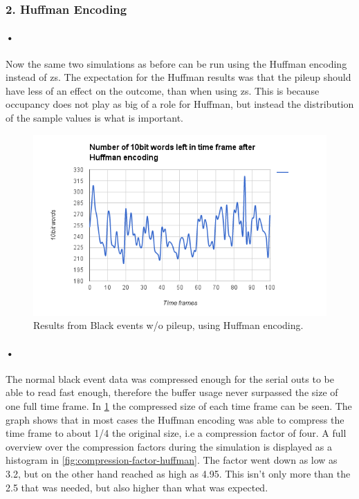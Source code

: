 \documentclass[a4paper, 12pt]{report}
\begin{document}
\subsubsection{2. Huffman Encoding}

\paragraph{•}
Now the same two simulations as before can be run using the Huffman encoding instead of \gls{zs}.
The expectation for the Huffman results was that the pileup should have less of an effect on the outcome, than when using \gls{zs}.
This is because occupancy does not play as big of a role for Huffman, but instead the distribution of the sample values is what is important.

\begin{figure}[h!]
	\centering
		\includegraphics[width=1.0\textwidth]{images/blackevents-huffman.png}
		\caption{Results from Black events w/o pileup, using Huffman encoding.}
		\label{fig:blackevents-huffman}
\end{figure}

\paragraph{•}
The normal black event data was compressed enough for the serial outs to be able to read fast enough, therefore the buffer usage never surpassed the size of one full time frame.
In \ref{fig:blackevents-huffman} the compressed size of each time frame can be seen.
The graph shows that in most cases the Huffman encoding was able to compress the time frame to about 1/4 the original size, i.e a compression factor of four.
A full overview over the compression factors during the simulation is displayed as a histogram in \ref{fig:compression-factor-huffman}.
The factor went down as low as 3.2, but on the other hand reached as high as 4.95.
This isn't only more than the 2.5 that was needed, but also higher than what was expected.
\end{document}
